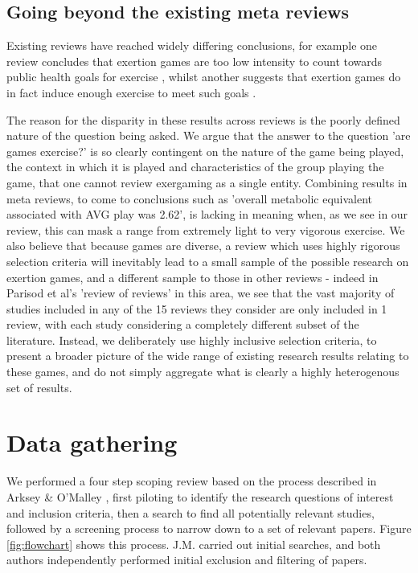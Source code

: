 
\subsection{Going beyond the existing meta reviews}

Existing reviews have reached widely differing conclusions, for example one review concludes that exertion games are too low intensity to count towards public health goals for exercise \cite{Peng2013UsingResearch}, whilst another suggests that exertion games do in fact induce enough exercise to meet such goals \cite{Sween2014TheReview}. 

The reason for the disparity in these results across reviews is the poorly defined nature of the question being asked. We argue that the answer to the question 'are games exercise?' is so clearly contingent on the nature of the game being played, the context in which it is played and characteristics of the group playing the game, that one cannot review exergaming as a single entity. Combining results in meta reviews, to come to conclusions such as 'overall metabolic equivalent associated with AVG play was 2.62'\cite{Dutta2015EffectsReview}, is lacking in meaning when, as we see in our review, this can mask a range from extremely light to very vigorous exercise. We also believe that because games are diverse, a review which uses highly rigorous selection criteria will inevitably lead to a small sample of the possible research on exertion games, and a different sample to those in other reviews - indeed in Parisod et al's 'review of reviews' in this area\cite{Parisod2014PromotingReviews}, we see that the vast majority of studies included in any of the 15 reviews they consider are only included in 1 review, with each study considering a completely different subset of the literature. Instead, we deliberately use highly inclusive selection criteria, to present a broader picture of the wide range of existing research results relating to these games, and do not simply aggregate what is clearly a highly heterogenous set of results. 

\section{Data gathering}

We performed a four step scoping review based on the process described in Arksey & O'Malley \cite{arksey2005scoping}, first piloting to identify the research questions of interest and inclusion criteria, then a search to find all potentially relevant studies, followed by a screening process to narrow down to a set of relevant papers. Figure \ref{fig:flowchart} shows this process. J.M. carried out initial searches, and both authors independently performed initial exclusion and filtering of papers.

